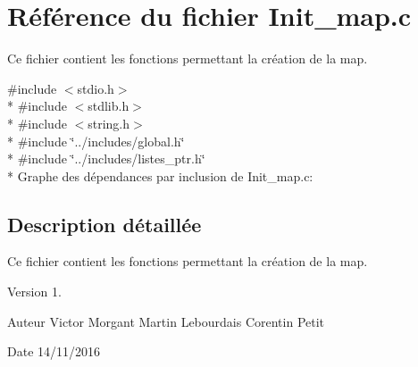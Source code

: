 \hypertarget{a00023}{}\section{Référence du fichier Init\+\_\+map.\+c}
\label{a00023}


Ce fichier contient les fonctions permettant la création de la map.  


{\ttfamily \#include $<$stdio.\+h$>$}\\*
{\ttfamily \#include $<$stdlib.\+h$>$}\\*
{\ttfamily \#include $<$string.\+h$>$}\\*
{\ttfamily \#include \char`\"{}../includes/global.\+h\char`\"{}}\\*
{\ttfamily \#include \char`\"{}../includes/listes\+\_\+ptr.\+h\char`\"{}}\\*
Graphe des dépendances par inclusion de Init\+\_\+map.\+c\+:


\subsection{Description détaillée}
Ce fichier contient les fonctions permettant la création de la map. 

\begin{DoxyVersion}{Version}
1. 
\end{DoxyVersion}
\begin{DoxyAuthor}{Auteur}
Victor Morgant Martin Lebourdais Corentin Petit 
\end{DoxyAuthor}
\begin{DoxyDate}{Date}
14/11/2016 
\end{DoxyDate}
